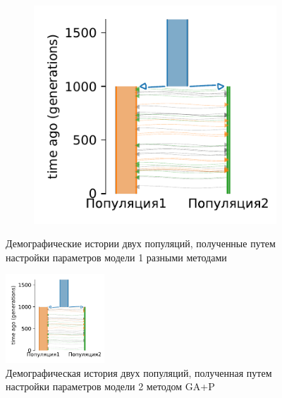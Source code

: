 \begin{figure}[ht]
\begin{subfigure}[b]{.33\textwidth}
    \caption{}
    \label{fig:part2:experiments:simulated_2:results_model_1_2}
    \end{subfigure}%
    \begin{subfigure}[b]{.33\textwidth}
    \includegraphics[width=\textwidth]{images_experiments/simulation_1/2pop/picture_1pop_model_1_ga_over.pdf}
    \caption{}
    \label{fig:part2:experiments:simulated_2:results_model_1_3}
    \end{subfigure}
    \caption{Демографические истории двух популяций, полученные путем настройки параметров модели 1 разными методами}
    \label{fig:part2:experiments:simulated_2:results_model_1}
\end{figure}

\begin{figure}[ht]
    \centering
    \includegraphics[width=0.33\textwidth]{images_experiments/simulation_1/2pop/picture_1pop_model_2_ga_over.pdf}
    \caption{Демографическая история двух популяций, полученная путем настройки параметров модели 2 методом GA+P}
    \label{fig:part2:experiments:simulated_2:results_model_2}
\end{figure}


